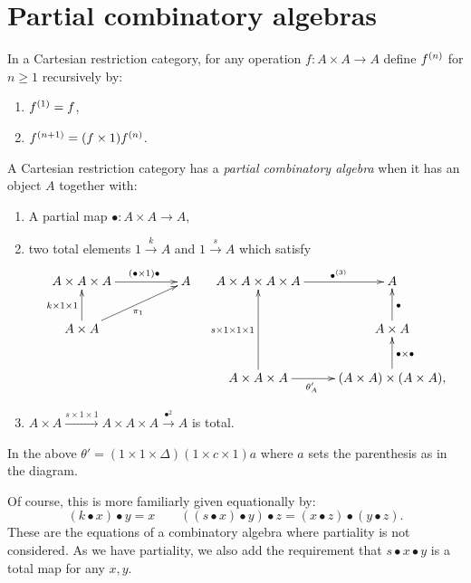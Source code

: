 \section{Partial combinatory algebras}
\label{sec:partial_combinatory_algebras}

In a Cartesian restriction category, for any operation $f:A\times A\to A$ define ${f}^{(n)}$
for $n\ge 1$  recursively by:
\begin{enumerate}[{(}i{)}]
  \item ${f}^{(1)} = f$,
  \item ${f}^{(n+1)} = (f\times 1) {f}^{(n)}$.
\end{enumerate}

\begin{definition}\label{def:partial_combinatory_algebra}
  A Cartesian restriction category has a \emph{partial combinatory algebra} when it has an object
  $A$ together with:
  \begin{enumerate}[{(}i{)}]
  \item A partial map $\bullet:A\times A \to A$,\label{defitem:pca-1}
  \item two total elements $1\xrightarrow{k}A$ and $1\xrightarrow{s}{A}$ which satisfy\label{defitem:pca-2}
    \[
      \xymatrix@C+25pt{
        A\times A\times A \ar[r]^(.6){(\bullet\times 1)\bullet} & A\\
        A\times A \ar[u]^{k\times1\times1} \ar[ur]_{\pi_1}
      }\quad
      \xymatrix{
        A\times A\times A\times A \ar[r]^(.6){\multibullet{3}}&A\\
        &A\times A \ar[u]_{\bullet}\\
        A\times A\times A \ar[uu]^{s\times1\times1\times1} \ar[r]_(.4){\theta_A'}
          & (A\times A) \times (A\times A), \ar[u]_{\bullet\times\bullet}
      }
    \]
    \item $A\times A \xrightarrow{s\times1\times1} A\times A\times A \xrightarrow{\bullet^2} A$ is total.\label{defitem:pca-3}
  \end{enumerate}
  In the above $\theta' = (1\times1\times\Delta)(1\times c \times 1)a$ where $a$ sets the
  parenthesis as in the diagram.
\end{definition}

Of course, this is more familiarly given equationally by:
\[
   (k\bullet x)\bullet y = x \qquad ((s\bullet x)\bullet y) \bullet z = (x\bullet z) \bullet
   (y\bullet z).
\]
These are the equations of a combinatory algebra where partiality is not considered. As we have
partiality, we also add the requirement that $s\bullet x\bullet y$ is a total map for any $x,y$.

